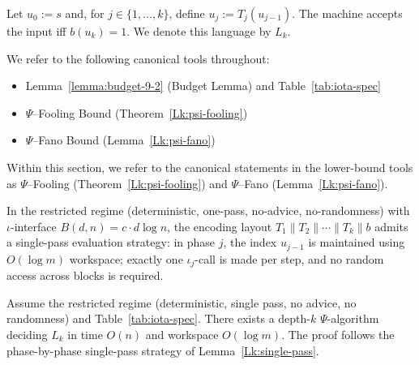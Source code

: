 \begin{definition}[Language $L_k$]
Let $u_0 := s$ and, for $j\in\{1,\ldots,k\}$, define $u_j := T_j(u_{j-1})$. The machine accepts the input iff $b(u_k)=1$. We denote this language by $L_k$.
\end{definition}

\begin{remark}
We refer to the following canonical tools throughout:
\begin{itemize}
  \item Lemma~\ref{lemma:budget-9-2} (Budget Lemma) and Table~\ref{tab:iota-spec}
  \item $\Psi$--Fooling Bound (Theorem~\ref{Lk:psi-fooling})
  \item $\Psi$--Fano Bound (Lemma~\ref{Lk:psi-fano})
\end{itemize}
\end{remark}


\begin{remark}\label{Lk:aliases}
Within this section, we refer to the canonical statements in the lower-bound tools as $\Psi$--Fooling (Theorem~\ref{Lk:psi-fooling}) and $\Psi$--Fano (Lemma~\ref{Lk:psi-fano}).
\end{remark}

\begin{lemma}\label{Lk:single-pass}
In the restricted regime (deterministic, one-pass, no-advice, no-randomness) with $\iota$-interface $B(d,n)=c\cdot d\log n$, the encoding layout $T_1\parallel T_2\parallel\cdots\parallel T_k\parallel b$ admits a single-pass evaluation strategy: in phase $j$, the index $u_{j-1}$ is maintained using $O(\log m)$ workspace; exactly one $\iota_j$-call is made per step, and no random access across blocks is required.
\end{lemma}

\begin{theorem}[UB at depth $k$]\label{Lk:ub-main}
Assume the restricted regime (deterministic, single pass, no advice, no randomness) and Table~\ref{tab:iota-spec}. There exists a depth-$k$ $\Psi$-algorithm deciding $L_k$ in time $O(n)$ and workspace $O(\log m)$. The proof follows the phase-by-phase single-pass strategy of Lemma~\ref{Lk:single-pass}.
\end{theorem}

